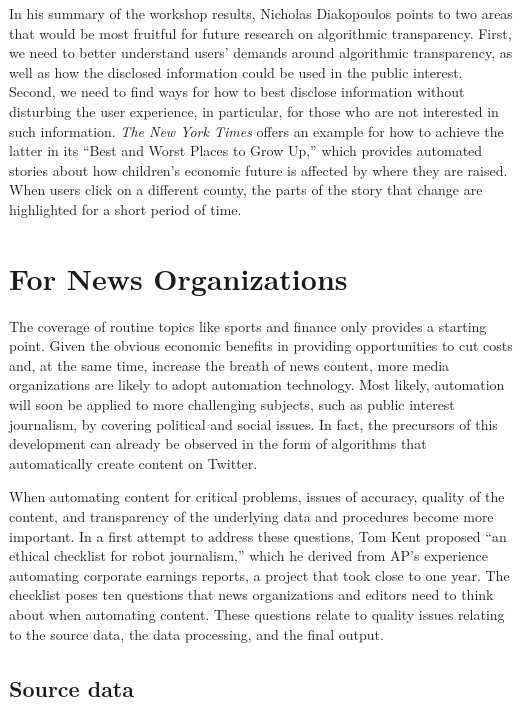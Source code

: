 \documentclass[notoc, symmetric, nobib, nols]{towcenter-guideto-book}
\begin{document}
In his summary of the workshop results, Nicholas Diakopoulos points to two areas that would be most fruitful for future research on algorithmic transparency.\autocite{diak15} First, we need to better understand users' demands around algorithmic transparency, as well as how the disclosed information could be used in the public interest. Second, we need to find ways for how to best disclose information without disturbing the user experience, in particular, for those who are not interested in such information. \textit{The New York Times} offers an example for how to achieve the latter in its ``Best and Worst Places to Grow Up,'' which provides automated stories about how children's economic future is affected by where they are raised.\autocite{leon15} When users click on a different county, the parts of the story that change are highlighted for a short period of time.

\section{For News Organizations}

The coverage of routine topics like sports and finance only provides a starting point. Given the obvious economic benefits in providing opportunities to cut costs and, at the same time, increase the breath of news content, more media organizations are likely to adopt automation technology. Most likely, automation will soon be applied to more challenging subjects, such as public interest journalism, by covering political and social issues. In fact, the precursors of this development can already be observed in the form of algorithms that automatically create content on Twitter.\autocite{lokot15} 

When automating content for critical problems, issues of accuracy, quality of the content, and transparency of the underlying data and procedures become more important. In a first attempt to address these questions, Tom Kent proposed ``an ethical checklist for robot journalism,'' which he derived from AP's experience automating corporate earnings reports, a project that took close to one year. The checklist poses ten questions that news organizations and editors need to think about when automating content.\autocite{kent15} These questions relate to quality issues relating to the source data, the data processing, and the final output.

\subsection{Source data}
\end{document}
